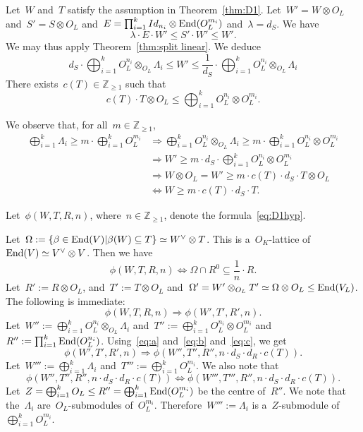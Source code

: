 \documentclass[12pt]{amsart}
\newcommand{\End}{{\rm End}}
\newcommand{\Z}{{\mathbb Z}}
\newcommand{\tens}{\otimes}
\begin{document}
Let~$W$ and~$T$ satisfy the assumption in Theorem~\ref{thm:D1}. Let~$W'=W\tens O_L$ and~$S'=S\tens O_L$
and~$E= \prod^k_{i=1}Id_{n_i}\tens \End(O_L^{m_i})$ and~$\lambda=d_S$. We have
\[
\lambda\cdot E\cdot W'\leq S'\cdot W' \leq W'.
\]
We may thus apply Theorem~\ref{thm:split linear}. We deduce
\begin{equation}\label{eq:a}
d_S\cdot\bigoplus_{i=1}^k O_L^{n_i}\tens_{O_L}\Lambda_i\leq
W'\leq\frac{1}{d_S}\cdot  \bigoplus_{i=1}^k O_L^{n_i}\tens_{O_L}\Lambda_i
\end{equation}
There exists~$c(T)\in\Z_{\geq1}$ such that
\begin{equation}\label{eq:c}
c(T)\cdot T\tens O_L\leq \bigoplus_{i=1}^k O_L^{n_i}\tens O_L^{m_i}.
\end{equation}

We observe that, for all~$m\in\Z_{\geq1}$,
\begin{align}
\bigoplus_{i=1}^k \Lambda_i
\geq m\cdot \bigoplus_{i=1}^k O_L^{m_i}
&\Rightarrow
\bigoplus_{i=1}^k O_L^{n_i}\tens_{O_L}\Lambda_i
\geq m\cdot \bigoplus_{i=1}^k O_L^{n_i}\tens O_L^{m_i}
\\
&\Rightarrow
W'\geq m\cdot d_S\cdot  \bigoplus_{i=1}^k O_L^{n_i}\tens O_L^{m_i}
\\
&\Rightarrow
W\tens O_L=W'\geq m\cdot c(T)\cdot d_S\cdot T\tens O_L
\\
&\Leftrightarrow 
W\geq m\cdot c(T)\cdot d_S\cdot  T.
\end{align}

Let~$\phi(W,T,R,n)$, where~$n\in\Z_{\geq1}$, denote the formula~\eqref{eq:D1hyp}.

Let~$\Omega:=\{\beta\in \End(V)|\beta(W)\subseteq T\}\simeq W^\vee\tens T$. This is a~$O_K$-lattice of~$\End(V)\simeq V^\vee\tens V$. Then we have
\[
\phi(W,T,R,n)\Leftrightarrow \Omega\cap R^0\subseteq \frac{1}{n}\cdot R.
\]
Let~$R':=R\tens O_L$, and~$T':=T\tens O_L$ and~$\Omega'=W'\tens_{O_L}T'\simeq \Omega\tens O_L\leq \End(V_L)$.
The following is immediate:
\begin{equation}\label{eq:alpha}
\phi(W,T,R,n)\Rightarrow \phi(W',T',R',n).
\end{equation}
Let~$W'':=
\bigoplus_{i=1}^k O_L^{n_i}\tens_{O_L}\Lambda_i$ and~$T'':=\bigoplus_{i=1}^k O_L^{n_i}\tens O_L^{m_i}$
and~$R'':=\prod^k_{i=1}\End(O_L^{n_i})$.
Using~\eqref{eq:a} and~\eqref{eq:b} and~\eqref{eq:c}, we get
\begin{equation}\label{eq:beta}
\phi(W',T',R',n)\Rightarrow \phi(W'',T'',R'',n\cdot d_S\cdot d_R\cdot c(T)).
\end{equation}
Let~$W''':=\bigoplus_{i=1}^k \Lambda_i$ and~$T''':=\bigoplus_{i=1}^k O_L^{m_i}$. 
We also note that
\begin{equation}\label{eq:gamma}
\phi(W'',T'',R'',n\cdot d_S\cdot d_R\cdot c(T))\Leftrightarrow 
\phi(W''',T''',R'',n\cdot d_S\cdot d_R\cdot c(T)).
\end{equation}
Let~$Z=\bigoplus_{i=1}^k  O_L\leq R''=\bigoplus_{i=1}^k \End(O_L^{m_i})$ be the centre of~$R''$.
We note that the~$\Lambda_i$ are~$O_L$-submodules of~$O_L^{m_i}$. Therefore~$W''':=\Lambda_i$ is a~$Z$-submodule
of~$\bigoplus_{i=1}^k O_L^{m_i}$.
\end{document}
